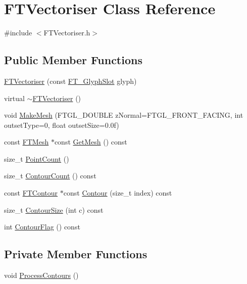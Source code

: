 \hypertarget{class_f_t_vectoriser}{}\section{F\+T\+Vectoriser Class Reference}
\label{class_f_t_vectoriser}


{\ttfamily \#include $<$F\+T\+Vectoriser.\+h$>$}

\subsection*{Public Member Functions}
\begin{DoxyCompactItemize}
\item 
\hyperlink{class_f_t_vectoriser_a32ca6ea1d5e99fa0337f4e2430a336cb}{F\+T\+Vectoriser} (const \hyperlink{struct_f_t___glyph_slot_rec__}{F\+T\+\_\+\+Glyph\+Slot} glyph)
\item 
virtual \hyperlink{class_f_t_vectoriser_a76d1b9b2a0333b8cb5c21b25f51001dd}{$\sim$\+F\+T\+Vectoriser} ()
\item 
void \hyperlink{class_f_t_vectoriser_a3c74bd2dc8f6292a920d17d8e1d0266f}{Make\+Mesh} (F\+T\+G\+L\+\_\+\+D\+O\+U\+B\+LE z\+Normal=F\+T\+G\+L\+\_\+\+F\+R\+O\+N\+T\+\_\+\+F\+A\+C\+I\+NG, int outset\+Type=0, float outset\+Size=0.\+0f)
\item 
const \hyperlink{class_f_t_mesh}{F\+T\+Mesh} $\ast$const \hyperlink{class_f_t_vectoriser_adbc45a678dcd5da1bdc122f18e1397a7}{Get\+Mesh} () const 
\item 
size\+\_\+t \hyperlink{class_f_t_vectoriser_aff1d33b51ede40e45f80d143cd4b7680}{Point\+Count} ()
\item 
size\+\_\+t \hyperlink{class_f_t_vectoriser_a9b65af714c20171fb61e9d62e802290a}{Contour\+Count} () const 
\item 
const \hyperlink{class_f_t_contour}{F\+T\+Contour} $\ast$const \hyperlink{class_f_t_vectoriser_ad0bc396b4fbc01046264e365646b4449}{Contour} (size\+\_\+t index) const 
\item 
size\+\_\+t \hyperlink{class_f_t_vectoriser_a73345585f77d37d84362ce2b60a18be9}{Contour\+Size} (int c) const 
\item 
int \hyperlink{class_f_t_vectoriser_a257790691ff01bcf7ca1a7f1e2362f8c}{Contour\+Flag} () const 
\end{DoxyCompactItemize}
\subsection*{Private Member Functions}
\begin{DoxyCompactItemize}
\item 
void \hyperlink{class_f_t_vectoriser_a486657a9f14f55300dec6eed7e37e390}{Process\+Contours} ()
\end{DoxyCompactItemize}

